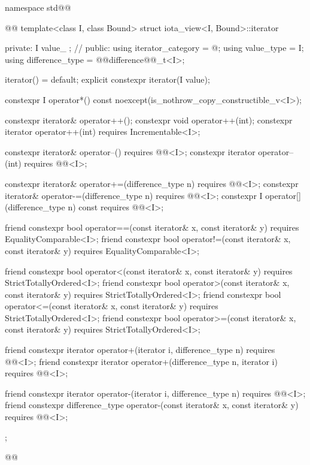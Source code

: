 \begin{codeblock}
namespace std@@ { @@
  template<class I, class Bound>
  struct iota_view<I, Bound>::iterator {
  private:
    I value_ {}; // \expos
  public:
    using iterator_category = @\seebelownc@;
    using value_type = I;
    using difference_type = @@difference@@_t<I>;

    iterator() = default;
    explicit constexpr iterator(I value);

    constexpr I operator*() const noexcept(is_nothrow_copy_constructible_v<I>);

    constexpr iterator& operator++();
    constexpr void operator++(int);
    constexpr iterator operator++(int) requires Incrementable<I>;

    constexpr iterator& operator--() requires @@<I>;
    constexpr iterator operator--(int) requires @@<I>;

    constexpr iterator& operator+=(difference_type n)
      requires @@<I>;
    constexpr iterator& operator-=(difference_type n)
      requires @@<I>;
    constexpr I operator[](difference_type n) const
      requires @@<I>;

    friend constexpr bool operator==(const iterator& x, const iterator& y)
      requires EqualityComparable<I>;
    friend constexpr bool operator!=(const iterator& x, const iterator& y)
      requires EqualityComparable<I>;

    friend constexpr bool operator<(const iterator& x, const iterator& y)
      requires StrictTotallyOrdered<I>;
    friend constexpr bool operator>(const iterator& x, const iterator& y)
      requires StrictTotallyOrdered<I>;
    friend constexpr bool operator<=(const iterator& x, const iterator& y)
      requires StrictTotallyOrdered<I>;
    friend constexpr bool operator>=(const iterator& x, const iterator& y)
      requires StrictTotallyOrdered<I>;

    friend constexpr iterator operator+(iterator i, difference_type n)
      requires @@<I>;
    friend constexpr iterator operator+(difference_type n, iterator i)
      requires @@<I>;

    friend constexpr iterator operator-(iterator i, difference_type n)
      requires @@<I>;
    friend constexpr difference_type operator-(const iterator& x, const iterator& y)
      requires @@<I>;
  };
}@\oldtxt{\}}@
\end{codeblock}


